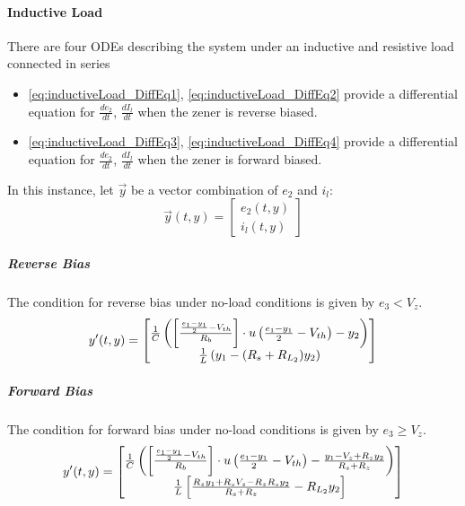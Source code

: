 \paragraph{Inductive Load}
There are four ODEs describing the system under an inductive and resistive load connected in series
\begin{itemize}
	\item \eqref{eq:inductiveLoad_DiffEq1}, \eqref{eq:inductiveLoad_DiffEq2} provide a differential equation for $\frac{de_2}{dt}$, $\frac{dI_l}{dt}$ when the zener is reverse biased.
	\item \eqref{eq:inductiveLoad_DiffEq3}, \eqref{eq:inductiveLoad_DiffEq4} provide a differential equation for $\frac{de_2}{dt}$, $\frac{dI_l}{dt}$ when the zener is forward biased.
\end{itemize}
In this instance, let $\vec{y}$ be a vector combination of $e_2$ and $i_l$:
\begin{equation}
	\vec{y}(t,y) = \begin{bmatrix}
		e_2(t,y) \\
		i_l(t,y)
	\end{bmatrix}
\end{equation}
\subparagraph{Reverse Bias}
The condition for reverse bias under no-load conditions is given by $e_3 < V_z$.
\begin{equation}
	y'(t,y) = \begin{bmatrix}
		 \frac{1}{C}\left(\left[\frac{\frac{e_1 - y_1}{2} - V_{th}}{R_b} \right]\cdot u\left(\frac{e_1 - y_1}{2} - V_{th} \right) - y_2 \right) \\
		 \frac{1}{L}\left(y_1 - (R_s + R_{L_2})y_2 \right)
	\end{bmatrix}
\end{equation}
\subparagraph{Forward Bias}
The condition for forward bias under no-load conditions is given by $e_3 \geq V_z$.  
\begin{equation}
	y'(t,y) = \begin{bmatrix}
		 \frac{1}{C}\left(\left[\frac{\frac{e_1 - y_1}{2} - V_{th}}{R_b} \right]\cdot u\left(\frac{e_1 - y_1}{2} - V_{th} \right) - \frac{y_1 - V_z + R_z y_2}{R_s + R_z} \right) \\
		 \frac{1}{L} \left[\frac{R_z y_1 + R_s V_z - R_z R_s y_2}{R_s + R_z} - R_{L_2}y_2 \right]
	\end{bmatrix}
\end{equation}